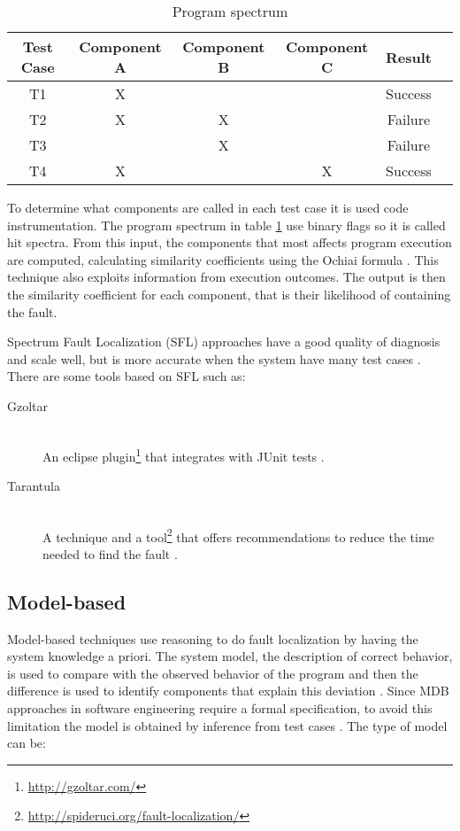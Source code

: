 \begin{table}[H]
    \begin{center}
    \caption{Program spectrum}
    \label{table:spectrum}
    \begin{tabular}{ | c | c | c | c | c | c |}
        \hline
        Test Case & Component A & Component B & Component C & Result \\ \hline
        T1 & X & & & Success \\ \hline
        T2 & X & X & & Failure \\ \hline
        T3 &  & X & & Failure \\ \hline
        T4 & X &  & X & Success \\ \hline
    \end{tabular}
    \end{center}
\end{table}

To determine what components are called in each test case it is used code instrumentation. The program spectrum in table \ref{table:spectrum} use binary flags so it is called hit spectra. From this input, the components that most affects program execution are computed, calculating similarity coefficients using the Ochiai formula \cite{Abreu:2009:SMF:1747491.1747511}. This technique also exploits information from execution outcomes. The output is then the similarity coefficient for each component, that is their likelihood of containing the fault. 

Spectrum Fault Localization (SFL) approaches have a good quality of diagnosis and scale well, but is more accurate when the system have many test cases \cite{Mayer2008}. There are some tools based on SFL such as:

\begin{description}
\item[Gzoltar] \hfill \\
An eclipse plugin\footnote{\url{http://gzoltar.com/}} that integrates with JUnit tests \cite{Campos:2012:GEP:2351676.2351752}.
\item[Tarantula] \hfill \\
A technique and a tool\footnote{\url{http://spideruci.org/fault-localization/}} that offers recommendations to reduce the time needed to find the fault \cite{jones05}.
\end{description}

\subsection{Model-based}
Model-based techniques use reasoning to do fault localization by having the system knowledge a priori. The system model, the description of correct behavior, is used to compare with the observed behavior of the program and then the difference is used to identify components that explain this deviation \cite{Mayer2008}. Since MDB approaches in software engineering require a formal specification, to avoid this limitation the model is obtained by inference from test cases \cite{Perez2004}. The type of model can be:

